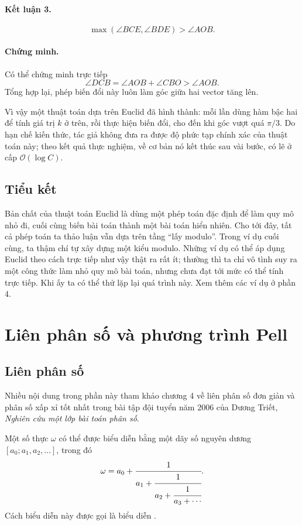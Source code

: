 \documentclass[11pt]{article}
\newcommand{\Oh}{\mathcal{O}}
\begin{document}
\paragraph{Kết luận 3.}
\[
  \max(\angle BCE,\angle BDE)>\angle AOB.
\]

\paragraph{Chứng minh.}
Có thể chứng minh trực tiếp
\[
  \angle DCB=\angle AOB+\angle CBO>\angle AOB.
\]
Tổng hợp lại, phép biến đổi này luôn làm góc giữa hai vector tăng lên.

Vì vậy một thuật toán dựa trên Euclid đã hình thành: mỗi lần dùng hàm bậc hai
để tính giá trị $k$ ở trên, rồi thực hiện biến đổi, cho đến khi góc vượt quá
$\pi/3$. Do hạn chế kiến thức, tác giả không đưa ra được độ phức tạp chính xác
của thuật toán này; theo kết quả thực nghiệm, về cơ bản nó kết thúc sau vài
bước, có lẽ ở cấp $\Oh(\log C)$.

\subsection{Tiểu kết}

Bản chất của thuật toán Euclid là dùng một phép toán đặc định để làm quy mô
nhỏ đi, cuối cùng biến bài toán thành một bài toán hiển nhiên. Cho tới đây,
tất cả phép toán ta thảo luận vẫn dựa trên tầng ``lấy modulo''. Trong ví dụ
cuối cùng, ta thậm chí tự xây dựng một kiểu modulo. Những ví dụ có thể áp
dụng Euclid theo cách trực tiếp như vậy thật ra rất ít; thường thì ta chỉ vô
tình suy ra một công thức làm nhỏ quy mô bài toán, nhưng chưa đạt tới mức có
thể tính trực tiếp. Khi ấy ta có thể thử lặp lại quá trình này. Xem thêm các
ví dụ ở phần 4.

\section{Liên phân số và phương trình Pell}

\subsection{Liên phân số}

Nhiều nội dung trong phần này tham khảo chương 4 về liên phân số đơn giản và
phân số xấp xỉ tốt nhất trong bài tập đội tuyển năm 2006 của Dương Triết,
\textit{Nghiên cứu một lớp bài toán phân số}.

Một số thực $\omega$ có thể được biểu diễn bằng một dãy số nguyên dương
$[a_0;a_1,a_2,\ldots]$, trong đó
\[
  \omega=a_0+\cfrac{1}{a_1+\cfrac{1}{a_2+\cfrac{1}{a_3+\cdots}}}.
\]
Cách biểu diễn này được gọi là biểu diễn .
\end{document}
